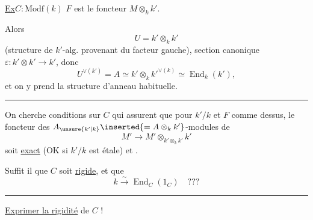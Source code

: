 \uline{Ex}\qquad $C:\mathrm{Modf}(k)$\qquad
$F$ est le foncteur $M\otimes_k k'$.

Alors
\[
U=k'\otimes_k k'
\]
(structure de $k'$-alg. provenant du facteur gauche),
section canonique $\varepsilon:k'\otimes k'\longrightarrow k'$,
donc
\[
U^{\vee(k')}=A\simeq k'\otimes_k {k'}^{\vee(k)}
\simeq\operatorname{End}_k(k'),
\]
et on y prend la structure d'anneau habituelle.


\par\noindent\rule{.85\linewidth}{.4pt}\par
On cherche conditions  sur  $C$ qui
assurent que pour 
$k'/k$ et $F$ comme dessus, le foncteur des
$A_{\unsure{k'|k}}\inserted{=A\otimes_k k'}$-modules de 
\[
M'\longrightarrow M'\otimes_{k'\otimes_k k'}k'
\]
soit \uline{exact} (OK si $k'/k$ est étale) et .

Suffit il que $C$ soit \uline{rigide}, et que
\[
k\xrightarrow{\sim}\operatorname{End}_C(1_C)\quad???
\]
\par\hspace{.3\linewidth}\rule{.25\linewidth}{.4pt}\par
\uline{Exprimer la rigidité} de $C$ !
